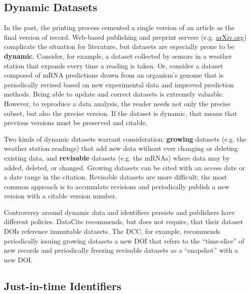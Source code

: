 \documentclass[10pt,twocolumn]{article}
\begin{document}
\subsection*{Dynamic Datasets}\label{dynamic-data}

In the past, the printing process cemented a single version of an article as the final version of record.
Web-based publishing and preprint servers (e.g. \href{http://arxiv.org/}{arXiv.org}) complicate the situation for literature, but datasets are especially prone to be \textbf{dynamic}.
Consider, for example, a dataset collected by sensors in a weather station that expands every time a reading is taken.
Or, consider a dataset composed of mRNA predictions drawn from an organism's genome that is periodically revised based on new experimental data and improved prediction methods. %
Being able to update and correct datasets is extremely valuable.
However, to reproduce a data analysis, the reader needs not only the precise subset, but also the precise version.
If the dataset is dynamic, that means that previous versions must be preserved and citable.

Two kinds of dynamic datasets warrant consideration: \textbf{growing} datasets (e.g. the weather station readings) that add new data without ever changing or deleting existing data, and \textbf{revisable} datasets (e.g. the mRNAs) where data may by added, deleted, or changed.  %
Growing datasets can be cited with an access date or a date range in the citation.
Revisable datasets are more difficult; the most common approach is to accumulate revisions and periodically publish a new version with a citable version number. %

Controversy around dynamic data and identifiers persists and publishers have different policies.
DataCite recommends, but does not require, that their dataset DOIs reference immutable datasets.  
The DCC, for example, recommends periodically issuing growing datasets a new DOI that refers to the ``time-slice'' of new records and periodically freezing revisable datasets as a ``snapshot'' with a new DOI.

\subsection*{Just-in-time Identifiers}\label{just-in-time-identifiers}
\end{document}
